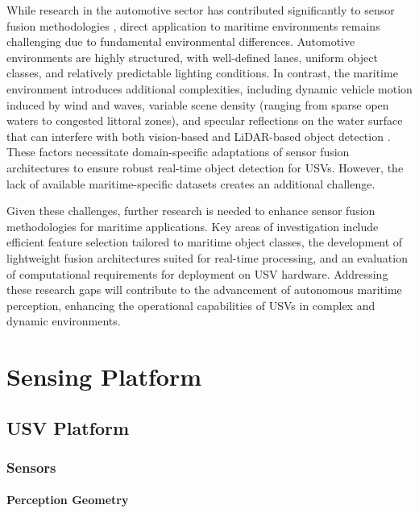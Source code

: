 \documentclass{erauthesis}
\begin{document}
While research in the automotive sector has contributed significantly to sensor fusion methodologies \cite{yeong2021,clunie2021,roriz2022,cui2022,das2022,liu2023a}, direct application to maritime environments remains challenging due to fundamental environmental differences. 
Automotive environments are highly structured, with well-defined lanes, uniform object classes, and relatively predictable lighting conditions. 
In contrast, the maritime environment introduces additional complexities, including dynamic vehicle motion induced by wind and waves, variable scene density (ranging from sparse open waters to congested littoral zones), and specular reflections on the water surface that can interfere with both vision-based \cite{liu2023a} and \ac{LiDAR}-based object detection \cite{ahmed2024}.%
These factors necessitate domain-specific adaptations of sensor fusion architectures to ensure robust real-time object detection for \acp{USV}. 
However, the lack of available maritime-specific datasets \cite{jun-hwa2022,su2023,thompson2023} creates an additional challenge.

Given these challenges, further research is needed to enhance sensor fusion methodologies for maritime applications. 
Key areas of investigation include efficient feature selection tailored to maritime object classes, the development of lightweight fusion architectures suited for real-time processing, and an evaluation of computational requirements for deployment on \ac{USV} hardware. 
Addressing these research gaps will contribute to the advancement of autonomous maritime perception, enhancing the operational capabilities of \acp{USV} in complex and dynamic environments.

\chapter{Sensing Platform}

    \section{USV Platform}

        \subsection{Sensors}
        
            \subsubsection{Perception Geometry}
\end{document}
